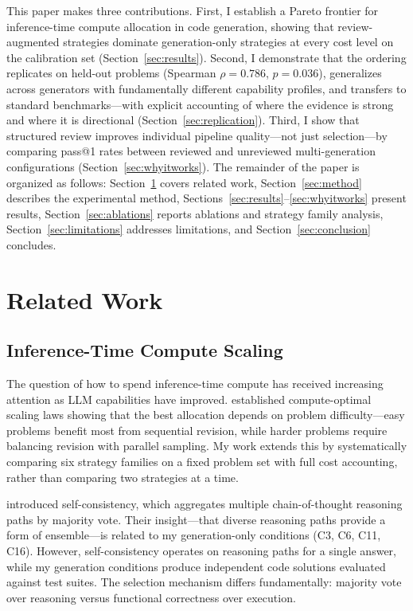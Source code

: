 \documentclass{article}
\begin{document}
This paper makes three contributions. First, I establish a Pareto frontier for inference-time compute allocation in code generation, showing that review-augmented strategies dominate generation-only strategies at every cost level on the calibration set (Section~\ref{sec:results}). Second, I demonstrate that the ordering replicates on held-out problems (Spearman $\rho=0.786$, $p=0.036$), generalizes across generators with fundamentally different capability profiles, and transfers to standard benchmarks---with explicit accounting of where the evidence is strong and where it is directional (Section~\ref{sec:replication}). Third, I show that structured review improves individual pipeline quality---not just selection---by comparing pass@1 rates between reviewed and unreviewed multi-generation configurations (Section~\ref{sec:whyitworks}). The remainder of the paper is organized as follows: Section~\ref{sec:related} covers related work, Section~\ref{sec:method} describes the experimental method, Sections~\ref{sec:results}--\ref{sec:whyitworks} present results, Section~\ref{sec:ablations} reports ablations and strategy family analysis, Section~\ref{sec:limitations} addresses limitations, and Section~\ref{sec:conclusion} concludes.

\section{Related Work}
\label{sec:related}

\subsection{Inference-Time Compute Scaling}

The question of how to spend inference-time compute has received increasing attention as LLM capabilities have improved. \citet{snell2024scaling} established compute-optimal scaling laws showing that the best allocation depends on problem difficulty---easy problems benefit most from sequential revision, while harder problems require balancing revision with parallel sampling. My work extends this by systematically comparing six strategy families on a fixed problem set with full cost accounting, rather than comparing two strategies at a time.

\citet{wang2023selfconsistency} introduced self-consistency, which aggregates multiple chain-of-thought reasoning paths by majority vote. Their insight---that diverse reasoning paths provide a form of ensemble---is related to my generation-only conditions (C3, C6, C11, C16). However, self-consistency operates on reasoning paths for a single answer, while my generation conditions produce independent code solutions evaluated against test suites. The selection mechanism differs fundamentally: majority vote over reasoning versus functional correctness over execution.
\end{document}
